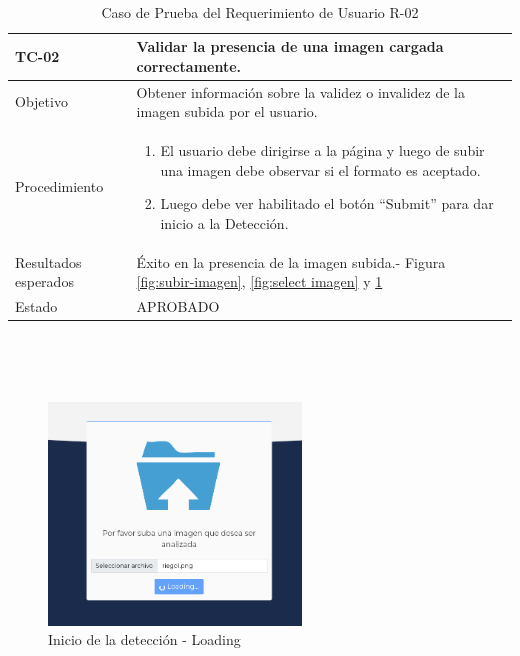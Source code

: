 \hfill \break
\\

\begin{table}[h!]
    \begin{tabular}{ | p{3cm} |p{9cm}| }
        \hline
        \rowcolor[HTML]{d6d8ff}
        TC-02 & Validar la presencia de una imagen cargada correctamente.\\
        \hline
        Objetivo & Obtener información sobre la validez o invalidez de la imagen subida por el usuario.\\
        \hline
        Procedimiento & \begin{enumerate}
            \item El usuario debe dirigirse a la página y luego de subir una imagen debe observar si el formato es aceptado.
            \item Luego debe ver habilitado el botón ``Submit'' para dar inicio a la Detección. 
        \end{enumerate}
        \\
        \hline
        Resultados esperados & Éxito en la presencia de la imagen subida.- Figura \ref{fig:subir-imagen}, \ref{fig:select imagen} y \ref{fig:loading1}\\
        \hline
        Estado & APROBADO \\
        \hline
    \end{tabular}\\
    \caption{Caso de Prueba del Requerimiento de Usuario R-02}
    \label{pruebar2}
\end{table}

\hfill \break
\\

\begin{figure}[h!]
    \centering
    \includegraphics[width=0.6\textwidth]{img/FE - detection loading.png}
    \caption{Inicio de la detección - Loading}
    \label{fig:loading1}
\end{figure}

